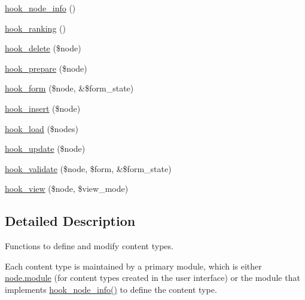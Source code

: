 \begin{DoxyCompactItemize}
\item 
\hyperlink{group__node__api__hooks_ga3b6ad51d7815d1cdd093b0e0f350cbd0}{hook\_\-node\_\-info} ()
\item 
\hyperlink{group__node__api__hooks_gaf7a28ce3230dc96833ea5338fd26f43c}{hook\_\-ranking} ()
\item 
\hyperlink{group__node__api__hooks_ga8588d8a814e8aef059d9e0f842904b35}{hook\_\-delete} (\$node)
\item 
\hyperlink{group__node__api__hooks_ga2dff6dd92802df6b776a4eeb0b1a737c}{hook\_\-prepare} (\$node)
\item 
\hyperlink{group__node__api__hooks_ga52618ef4643a60878dd5a76ff9bbff30}{hook\_\-form} (\$node, \&\$form\_\-state)
\item 
\hyperlink{group__node__api__hooks_ga3c6a28d33e07d3506e1eb99718ef4e39}{hook\_\-insert} (\$node)
\item 
\hyperlink{group__node__api__hooks_ga49065b040d7fb3e02889eda6361dac34}{hook\_\-load} (\$nodes)
\item 
\hyperlink{group__node__api__hooks_gaf9c98e3839e9405df42b50c8cdfa9dca}{hook\_\-update} (\$node)
\item 
\hyperlink{group__node__api__hooks_gacaf7cff104c642c28f76ce7ec5f33f40}{hook\_\-validate} (\$node, \$form, \&\$form\_\-state)
\item 
\hyperlink{group__node__api__hooks_gab1f229603b5e0f2f9d9e2a3ab53dcbda}{hook\_\-view} (\$node, \$view\_\-mode)
\end{DoxyCompactItemize}


\subsection{Detailed Description}
Functions to define and modify content types.

Each content type is maintained by a primary module, which is either \hyperlink{node_8module}{node.module} (for content types created in the user interface) or the module that implements \hyperlink{group__node__api__hooks_ga3b6ad51d7815d1cdd093b0e0f350cbd0}{hook\_\-node\_\-info()} to define the content type.

